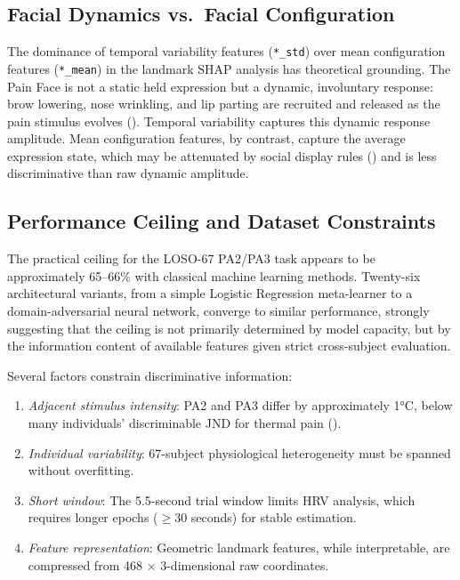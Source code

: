 \documentclass[10pt, twocolumn]{article}
\begin{document}
\subsection{Facial Dynamics vs.\ Facial Configuration}

The dominance of temporal variability features (\texttt{*\_std}) over mean configuration
features (\texttt{*\_mean}) in the landmark SHAP analysis has theoretical grounding. The
Pain Face is not a static held expression but a dynamic, involuntary response: brow
lowering, nose wrinkling, and lip parting are recruited and released as the pain stimulus
evolves (\cite{Kunz2019}). Temporal variability captures this dynamic response amplitude.
Mean configuration features, by contrast, capture the average expression state, which may
be attenuated by social display rules (\cite{Ekman1978}) and is less discriminative than
raw dynamic amplitude.

\subsection{Performance Ceiling and Dataset Constraints}

The practical ceiling for the LOSO-67 PA2/PA3 task appears to be approximately 65--66\%
with classical machine learning methods. Twenty-six architectural variants, from a simple
Logistic Regression meta-learner to a domain-adversarial neural network, converge to
similar performance, strongly suggesting that the ceiling is not primarily determined by
model capacity, but by the information content of available features given strict
cross-subject evaluation.

Several factors constrain discriminative information:
\begin{enumerate}
  \item \textit{Adjacent stimulus intensity}: PA2 and PA3 differ by approximately 1°C,
        below many individuals' discriminable JND for thermal pain (\cite{Yarnitsky1995}).
  \item \textit{Individual variability}: 67-subject physiological heterogeneity must be
        spanned without overfitting.
  \item \textit{Short window}: The 5.5-second trial window limits HRV analysis, which
        requires longer epochs ($\geq$30 seconds) for stable estimation.
  \item \textit{Feature representation}: Geometric landmark features, while interpretable,
        are compressed from 468 $\times$ 3-dimensional raw coordinates.
\end{enumerate}
\end{document}
